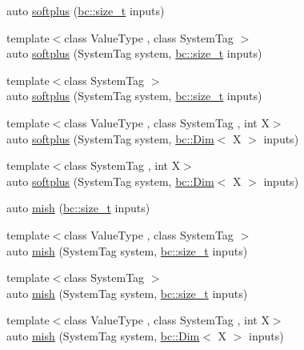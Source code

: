 \begin{DoxyCompactItemize}
\item 
auto \hyperlink{namespacebc_1_1nn_a2da6aad8df7a81917589a72c77aa04e1}{softplus} (\hyperlink{namespacebc_aaf8e3fbf99b04b1b57c4f80c6f55d3c5}{bc\+::size\+\_\+t} inputs)
\item 
{\footnotesize template$<$class Value\+Type , class System\+Tag $>$ }\\auto \hyperlink{namespacebc_1_1nn_a714a2159626268241bb644688f6cab47}{softplus} (System\+Tag system, \hyperlink{namespacebc_aaf8e3fbf99b04b1b57c4f80c6f55d3c5}{bc\+::size\+\_\+t} inputs)
\item 
{\footnotesize template$<$class System\+Tag $>$ }\\auto \hyperlink{namespacebc_1_1nn_a184b8d441f45f985daba7536d86e5f04}{softplus} (System\+Tag system, \hyperlink{namespacebc_aaf8e3fbf99b04b1b57c4f80c6f55d3c5}{bc\+::size\+\_\+t} inputs)
\item 
{\footnotesize template$<$class Value\+Type , class System\+Tag , int X$>$ }\\auto \hyperlink{namespacebc_1_1nn_ad623041ec1815227dcfcde29e6c41761}{softplus} (System\+Tag system, \hyperlink{structbc_1_1Dim}{bc\+::\+Dim}$<$ X $>$ inputs)
\item 
{\footnotesize template$<$class System\+Tag , int X$>$ }\\auto \hyperlink{namespacebc_1_1nn_a9f5f7e6d8257036f54139f9a984aa22e}{softplus} (System\+Tag system, \hyperlink{structbc_1_1Dim}{bc\+::\+Dim}$<$ X $>$ inputs)
\item 
auto \hyperlink{namespacebc_1_1nn_a4caea62ecbd9888f7d0a77661a2e7832}{mish} (\hyperlink{namespacebc_aaf8e3fbf99b04b1b57c4f80c6f55d3c5}{bc\+::size\+\_\+t} inputs)
\item 
{\footnotesize template$<$class Value\+Type , class System\+Tag $>$ }\\auto \hyperlink{namespacebc_1_1nn_aa3c0961368fefa7b538affb32f1e4e05}{mish} (System\+Tag system, \hyperlink{namespacebc_aaf8e3fbf99b04b1b57c4f80c6f55d3c5}{bc\+::size\+\_\+t} inputs)
\item 
{\footnotesize template$<$class System\+Tag $>$ }\\auto \hyperlink{namespacebc_1_1nn_abf3d50f04ead7ada621648fc8ef0dbdc}{mish} (System\+Tag system, \hyperlink{namespacebc_aaf8e3fbf99b04b1b57c4f80c6f55d3c5}{bc\+::size\+\_\+t} inputs)
\item 
{\footnotesize template$<$class Value\+Type , class System\+Tag , int X$>$ }\\auto \hyperlink{namespacebc_1_1nn_a65e90e567d7f2dc29cf67f9885b17811}{mish} (System\+Tag system, \hyperlink{structbc_1_1Dim}{bc\+::\+Dim}$<$ X $>$ inputs)

\end{DoxyCompactItemize}
